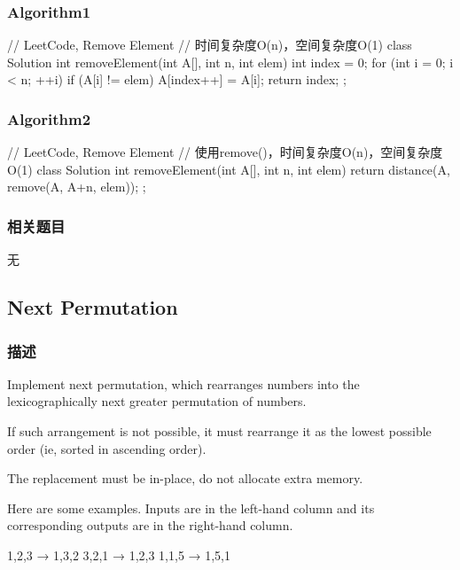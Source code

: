 \subsubsection{Algorithm1}
\begin{Code}
	// LeetCode, Remove Element
	// 时间复杂度O(n)，空间复杂度O(1)
	class Solution {
		int removeElement(int A[], int n, int elem) {
			int index = 0;
			for (int i = 0; i < n; ++i) {
				if (A[i] != elem) 
					A[index++] = A[i];
			}
			return index;
		}
	};
\end{Code}


\subsubsection{Algorithm2}
\begin{Code}
	// LeetCode, Remove Element
	// 使用remove()，时间复杂度O(n)，空间复杂度O(1)
	class Solution {
		int removeElement(int A[], int n, int elem) {
			return distance(A, remove(A, A+n, elem));
		}
	};
\end{Code}


\subsubsection{相关题目}
\begindot
\item 无
\myenddot


\subsection{Next Permutation} %
\label{sec:next-permutation}


\subsubsection{描述}
Implement next permutation, which rearranges numbers into the lexicographically 
next greater permutation of numbers.

If such arrangement is not possible, it must rearrange it as the lowest 
possible order (ie, sorted in ascending order).

The replacement must be in-place, do not allocate extra memory.

Here are some examples. Inputs are in the left-hand column and its 
corresponding outputs are in the right-hand column.
\begin{Code}
	1,2,3 → 1,3,2
	3,2,1 → 1,2,3
	1,1,5 → 1,5,1
\end{Code}


